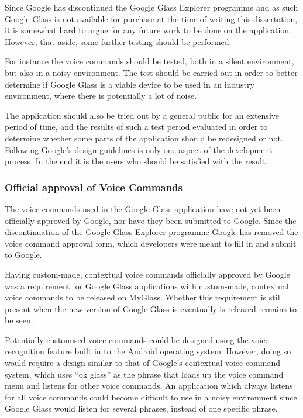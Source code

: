Since Google has discontinued the Google Glass Explorer programme and as such Google Glass is not available for purchase at the time of writing this dissertation, it is somewhat hard to argue for any future work to be done on the application. However, that aside, some further testing should be performed.

For instance the voice commands should be tested, both in a silent environment, but also in a noisy environment. The test should be carried out in order to better determine if Google Glass is a viable device to be used in an industry environment, where there is potentially a lot of noise. 

The application should also be tried out by a general public for an extensive period of time, and the results of such a test period evaluated in order to determine whether some parts of the application should be redesigned or not. Following Google's design guidelines is only one aspect of the development process. In the end it is the users who should be satisfied with the result.

\subsubsection{Official approval of Voice Commands}
The voice commands used in the Google Glass application have not yet been officially approved by Google, nor have they been submitted to Google. Since the discontinuation of the Google Glass Explorer programme Google has removed the voice command approval form, which developers were meant to fill in and submit to Google.

Having custom-made, contextual voice commands officially approved by Google was a requirement for Google Glass applications with custom-made, contextual voice commands to be released on MyGlass. Whether this requirement is still present when the new version of Google Glass is eventually is released remains to be seen.

Potentially customised voice commands could be designed using the voice recognition feature built in to the Android operating system. However, doing so would require a design similar to that of Google's contextual voice command system, which uses ``ok glass'' as the phrase that loads up the voice command menu and listens for other voice commands. An application which always listens for all voice commands could become difficult to use in a noisy environment since Google Glass would listen for several phrases, instead of one specific phrase.

